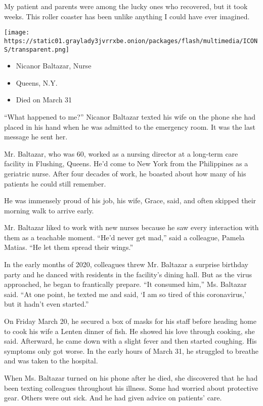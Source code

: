 My patient and parents were among the lucky ones who recovered, but it
took weeks. This roller coaster has been unlike anything I could have
ever imagined.

\texttt{[image: https://static01.graylady3jvrrxbe.onion/packages/flash/multimedia/ICONS/transparent.png]}

\begin{itemize}
\tightlist
\item
  Nicanor Baltazar, Nurse
\item
  Queens, N.Y.
\item
  Died on March 31
\end{itemize}

``What happened to me?'' Nicanor Baltazar texted his wife on the phone
she had placed in his hand when he was admitted to the emergency room.
It was the last message he sent her.

Mr. Baltazar, who was 60, worked as a nursing director at a long-term
care facility in Flushing, Queens. He'd come to New York from the
Philippines as a geriatric nurse. After four decades of work, he boasted
about how many of his patients he could still remember.

He was immensely proud of his job, his wife, Grace, said, and often
skipped their morning walk to arrive early.

Mr. Baltazar liked to work with new nurses because he saw every
interaction with them as a teachable moment. ``He'd never get mad,''
said a colleague, Pamela Matias. ``He let them spread their wings.''

In the early months of 2020, colleagues threw Mr. Baltazar a surprise
birthday party and he danced with residents in the facility's dining
hall. But as the virus approached, he began to frantically prepare. ``It
consumed him,'' Ms. Baltazar said. ``At one point, he texted me and
said, `I am so tired of this coronavirus,' but it hadn't even started.''

On Friday March 20, he secured a box of masks for his staff before
heading home to cook his wife a Lenten dinner of fish. He showed his
love through cooking, she said. Afterward, he came down with a slight
fever and then started coughing. His symptoms only got worse. In the
early hours of March 31, he struggled to breathe and was taken to the
hospital.

When Ms. Baltazar turned on his phone after he died, she discovered that
he had been texting colleagues throughout his illness. Some had worried
about protective gear. Others were out sick. And he had given advice on
patients' care.

